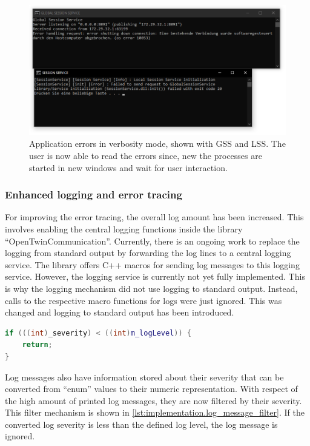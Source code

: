 \begin{figure}[hb]
	\centering
	\includegraphics[width=1\textwidth]{Figures/pause_batch_file.png}
	\caption{Application errors in verbosity mode, shown with \ac{GSS} and \ac{LSS}. The user is now able to read the errors since, new the processes are started in new windows and wait for user interaction.}
	\label{fig.implementation.pause_batch}
\end{figure}

\subsubsection*{Enhanced logging and error tracing}
For improving the error tracing, the overall log amount has been increased. This involves enabling the central logging functions inside the library \enquote{OpenTwinCommunication}. 
Currently, there is an ongoing work to replace the logging from standard output by forwarding the log lines to a central logging service. The library offers C++ macros for sending log messages to this logging service.  However, the logging service is currently not yet fully implemented. This is why the logging mechanism did not use logging to standard output. Instead, calls to the respective macro functions for logs were just ignored. This was changed and logging to standard output has been introduced. 
\begin{lstlisting}[label=lst:implementation.log_message_filter, caption={Comparison of the set log level with the log severity of the message. (\textit{/Libraries/OpenTwinCommunication/src/ServiceLogger.cpp})}, language=c++, firstnumber=60]
if (((int)_severity) < ((int)m_logLevel)) {
	return;
}
\end{lstlisting}
Log messages also have information stored about their severity that can be converted from \enquote{enum} values to their numeric representation. With respect of the high amount of printed log messages, they are now filtered by their severity. This filter mechanism is shown in \autoref{lst:implementation.log_message_filter}. If the converted log severity is less than the defined log level, the log message is ignored.

